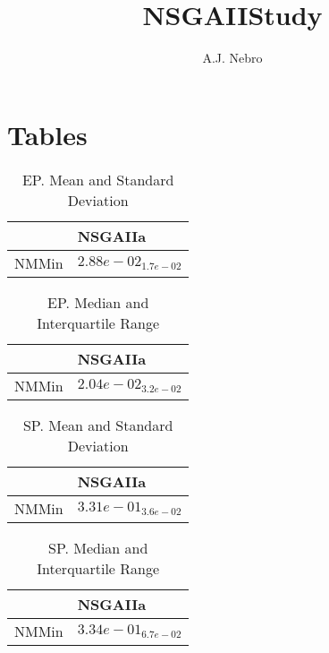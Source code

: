 \documentclass{article}
\title{NSGAIIStudy}
\author{A.J. Nebro}
\begin{document}
\maketitle
\section{Tables}

\begin{table}
\caption{EP. Mean and Standard Deviation}
\label{table: EP}
\centering
\begin{scriptsize}
\begin{tabular}{ll}
\hline &  NSGAIIa\\
\hline 
NMMin & \cellcolor{gray95}$  2.88e-02_{ 1.7e-02}$ \\
\hline
\end{tabular}
\end{scriptsize}
\end{table}

\begin{table}
\caption{EP. Median and Interquartile Range}
\label{table: EP}
\centering
\begin{scriptsize}
\begin{tabular}{ll}
\hline &  NSGAIIa\\
\hline 
NMMin & \cellcolor{gray95}$  2.04e-02_{ 3.2e-02}$ \\
\hline
\end{tabular}
\end{scriptsize}
\end{table}

\begin{table}
\caption{SP. Mean and Standard Deviation}
\label{table: SP}
\centering
\begin{scriptsize}
\begin{tabular}{ll}
\hline &  NSGAIIa\\
\hline 
NMMin & \cellcolor{gray95}$  3.31e-01_{ 3.6e-02}$ \\
\hline
\end{tabular}
\end{scriptsize}
\end{table}

\begin{table}
\caption{SP. Median and Interquartile Range}
\label{table: SP}
\centering
\begin{scriptsize}
\begin{tabular}{ll}
\hline &  NSGAIIa\\
\hline 
NMMin & \cellcolor{gray95}$  3.34e-01_{ 6.7e-02}$ \\
\hline
\end{tabular}
\end{scriptsize}
\end{table}
\end{document}
